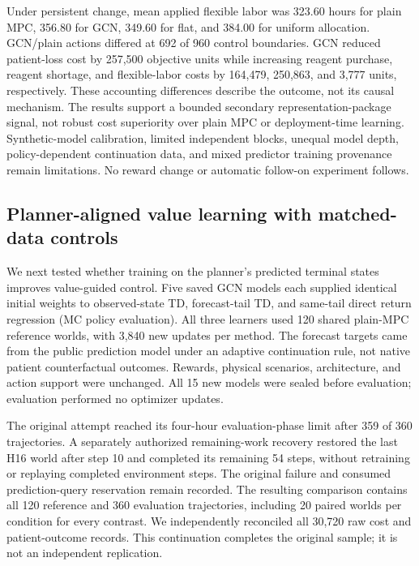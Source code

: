 \documentclass[preprint,review,12pt]{elsarticle}
\begin{document}
Under persistent change, mean applied flexible labor was 323.60 hours for plain
MPC, 356.80 for GCN, 349.60 for flat, and 384.00 for uniform allocation. GCN/plain
actions differed at 692 of 960 control boundaries. GCN reduced patient-loss
cost by 257,500 objective units while increasing reagent purchase, reagent
shortage, and flexible-labor costs by 164,479, 250,863, and 3,777 units,
respectively. These accounting differences describe the outcome, not its causal
mechanism. The results support a bounded secondary representation-package
signal, not robust cost superiority over plain MPC or deployment-time learning.
Synthetic-model calibration, limited independent blocks, unequal model depth,
policy-dependent continuation data, and mixed predictor training provenance
remain limitations. No reward change or automatic follow-on experiment follows.

\subsection{Planner-aligned value learning with matched-data controls}
\label{sec:planner-tail-development}

We next tested whether training on the planner's predicted terminal states
improves value-guided control. Five saved GCN models each supplied identical
initial weights to observed-state TD, forecast-tail TD, and same-tail direct
return regression (MC policy evaluation). All three learners used 120 shared
plain-MPC reference worlds, with 3,840 new updates per method. The forecast
targets came from the public prediction model under an adaptive continuation
rule, not native patient counterfactual outcomes. Rewards, physical scenarios,
architecture, and action support were unchanged. All 15 new models were sealed
before evaluation; evaluation performed no optimizer updates.

The original attempt reached its four-hour evaluation-phase limit after 359
of 360 trajectories. A separately authorized remaining-work recovery restored
the last H16 world after step 10 and completed its remaining 54 steps, without
retraining or replaying completed environment steps. The original failure and
consumed prediction-query reservation remain recorded. The resulting comparison
contains all 120 reference and 360 evaluation trajectories, including 20 paired
worlds per condition for every contrast. We independently reconciled all 30,720
raw cost and patient-outcome records. This continuation completes the original
sample; it is not an independent replication.
\end{document}
